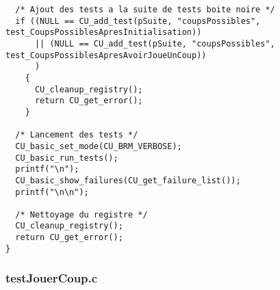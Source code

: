 \begin{lstlisting}
  /* Ajout des tests a la suite de tests boite noire */
  if ((NULL == CU_add_test(pSuite, "coupsPossibles", test_CoupsPossiblesApresInitialisation))
      || (NULL == CU_add_test(pSuite, "coupsPossibles", test_CoupsPossiblesApresAvoirJoueUnCoup))
      )
    {
      CU_cleanup_registry();
      return CU_get_error();
    }

  /* Lancement des tests */
  CU_basic_set_mode(CU_BRM_VERBOSE);
  CU_basic_run_tests();
  printf("\n");
  CU_basic_show_failures(CU_get_failure_list());
  printf("\n\n");

  /* Nettoyage du registre */
  CU_cleanup_registry();
  return CU_get_error();
}
\end{lstlisting}

\subsubsection{testJouerCoup.c}
